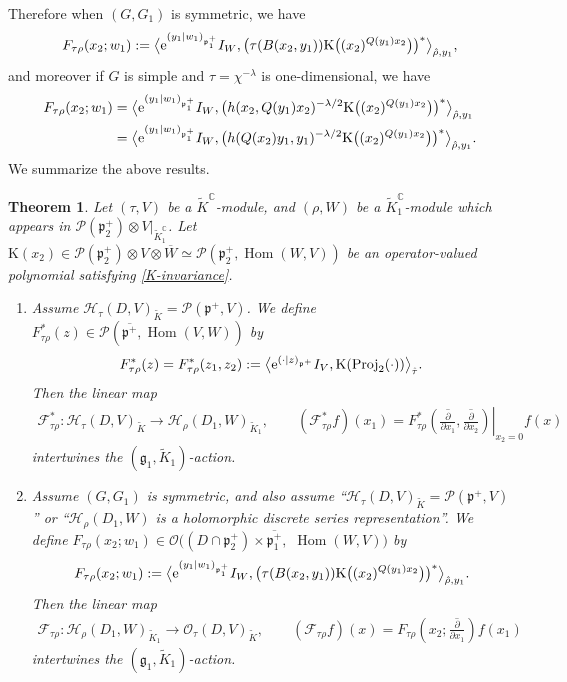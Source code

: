 \documentclass[pdftex]{sigma}
\numberwithin{equation}{section}
\newtheorem{Theorem}{Theorem}[section]
\newcommand{\BC}{\mathbb{C}}
\newcommand{\fg}{\mathfrak{g}}
\newcommand{\fp}{\mathfrak{p}}
\newcommand{\cF}{\mathcal{F}}
\newcommand{\cH}{\mathcal{H}}
\newcommand{\cO}{\mathcal{O}}
\newcommand{\cP}{\mathcal{P}}
\newcommand{\rK}{\mathrm{K}}
\newcommand{\Hom}{\operatorname{Hom}}
\newcommand{\Proj}{\operatorname{Proj}}
\begin{document}
Therefore when $(G,G_1)$ is symmetric, we have
\begin{gather*}
 F_{\tau\rho}(x_2;w_1)
:=\big\langle {\rm e}^{(y_1|w_1)_{\fp^+_1}}I_W,\bigl(\tau(B(x_2,y_1))\rK\big((x_2)^{Q(y_1)x_2}\big) \bigr)^*\big\rangle_{\hat{\rho},y_1},
\end{gather*}
and moreover if $G$ is simple and $\tau=\chi^{-\lambda}$ is one-dimensional, we have
\begin{align*}
F_{\tau\rho}(x_2;w_1)&=\big\langle {\rm e}^{(y_1|w_1)_{\fp^+_1}}I_W,
\big(h(x_2,Q(y_1)x_2)^{-\lambda/2}\rK\big((x_2)^{Q(y_1)x_2}\big)\big)^*\big\rangle_{\hat{\rho},y_1}\\
&=\big\langle {\rm e}^{(y_1|w_1)_{\fp^+_1}}I_W,
\big(h(Q(x_2)y_1,y_1)^{-\lambda/2}\rK\big((x_2)^{Q(y_1)x_2}\big)\big)^*\big\rangle_{\hat{\rho},y_1}.
\end{align*}
We summarize the above results.
\begin{Theorem}\label{main}
Let $(\tau,V)$ be a $\tilde{K}^\BC$-module, and $(\rho,W)$ be a $\tilde{K}_1^\BC$-module
which appears in $\cP(\fp^+_2)\otimes V|_{\tilde{K}_1^\BC}$.
Let $\rK(x_2)\in \cP(\fp^+_2)\otimes V\otimes\overline{W}\simeq\cP(\fp^+_2,\Hom(W,V))$ be an operator-valued polynomial
satisfying \eqref{K-invariance}.
\begin{enumerate}\itemsep=0pt
\item[$(1)$] Assume $\cH_\tau(D,V)_{\tilde{K}}=\cP(\fp^+,V)$.
We define $F_{\tau\rho}^*(z)\in\cP(\overline{\fp^+},\Hom(V,W))$ by
\begin{gather*} F_{\tau\rho}^*(z)=F_{\tau\rho}^*(z_1,z_2):=\big\langle {\rm e}^{(\cdot|z)_{\fp^+}}I_V,\rK(\Proj_2(\cdot))\big\rangle_{\hat{\tau}}. \end{gather*}
Then the linear map
\begin{gather*}
\cF_{\tau\rho}^*\colon \cH_\tau(D,V)_{\tilde{K}}\to\cH_\rho(D_1,W)_{\tilde{K}_1}, \qquad
(\cF_{\tau\rho}^*f)(x_1)
=F_{\tau\rho}^*\left.\left(\overline{\frac{\partial}{\partial x_1}},\overline{\frac{\partial}{\partial x_2}}\right)\right|_{x_2=0}f(x)
\end{gather*}
intertwines the $(\fg_1,\tilde{K}_1)$-action.
\item[$(2)$] Assume $(G,G_1)$ is symmetric, and also assume ``$\cH_\tau(D,V)_{\tilde{K}}=\cP(\fp^+,V)$'' or ``$\cH_\rho(D_1,W)$ is
a holomorphic discrete series representation''.
We define $F_{\tau\rho}(x_2;w_1)\in\cO((D\cap\fp^+_2)\times\overline{\fp^+_1},$ $\Hom(W,V))$ by
\begin{gather*}
 F_{\tau\rho}(x_2;w_1)
:=\big\langle {\rm e}^{(y_1|w_1)_{\fp^+_1}}I_W,\bigl(\tau(B(x_2,y_1))\rK\big((x_2)^{Q(y_1)x_2}\big)\bigr)^*\big\rangle_{\hat{\rho},y_1}.
\end{gather*}
Then the linear map
\begin{gather*}
\cF_{\tau\rho}\colon \cH_\rho(D_1,W)_{\tilde{K}_1}\to \cO_\tau(D,V)_{\tilde{K}}, \qquad
(\cF_{\tau\rho}f)(x) =F_{\tau\rho}\left(x_2;\overline{\frac{\partial}{\partial x_1}}\right)f(x_1)
\end{gather*}
intertwines the $(\fg_1,\tilde{K}_1)$-action.
\end{enumerate}
\end{Theorem}
\end{document}
